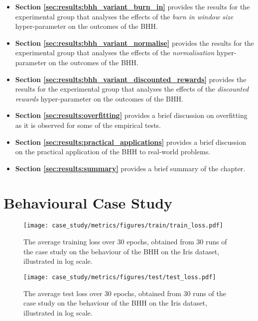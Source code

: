 \begin{itemize}
	\item \textbf{Section \ref{sec:results:bhh_variant_burn_in}} provides the results for the experimental group that analyses the effects of the \textit{burn in window size} hyper-parameter on the outcomes of the \acs{BHH}.

	\item \textbf{Section \ref{sec:results:bhh_variant_normalise}} provides the results for the experimental group that analyses the effects of the \textit{normalisation} hyper-parameter on the outcomes of the \acs{BHH}.

	\item \textbf{Section \ref{sec:results:bhh_variant_discounted_rewards}} provides the results for the experimental group that analyses the effects of the \textit{discounted rewards} hyper-parameter on the outcomes of the \acs{BHH}.

	\item \textbf{Section \ref{sec:results:overfitting}} provides a brief discussion on overfitting as it is observed for some of the empirical tests.

	\item \textbf{Section \ref{sec:results:practical_applications}} provides a brief discussion on the practical application of the \acs{BHH} to real-world problems.

	\item \textbf{Section \ref{sec:results:summary}} provides a brief summary of the chapter.
\end{itemize}

\section{Behavioural Case Study}\label{sec:results:case_study}



\begin{figure}[htpb]
	\centering
	\texttt{[image: case\_study/metrics/figures/train/train\_loss.pdf]}
	\caption{The average training loss over 30 epochs, obtained from 30 runs of the case study on the behaviour of the \acs{BHH} on the Iris dataset, illustrated in log scale.}
	\label{fig:results:case_study:train_loss}
\end{figure}

\begin{figure}[htpb]
	\centering
	\texttt{[image: case\_study/metrics/figures/test/test\_loss.pdf]}
	\caption{The average test loss over 30 epochs, obtained from 30 runs of the case study on the behaviour of the \acs{BHH} on the Iris dataset, illustrated in log scale.}
	\label{fig:results:case_study:test_loss}
\end{figure}

